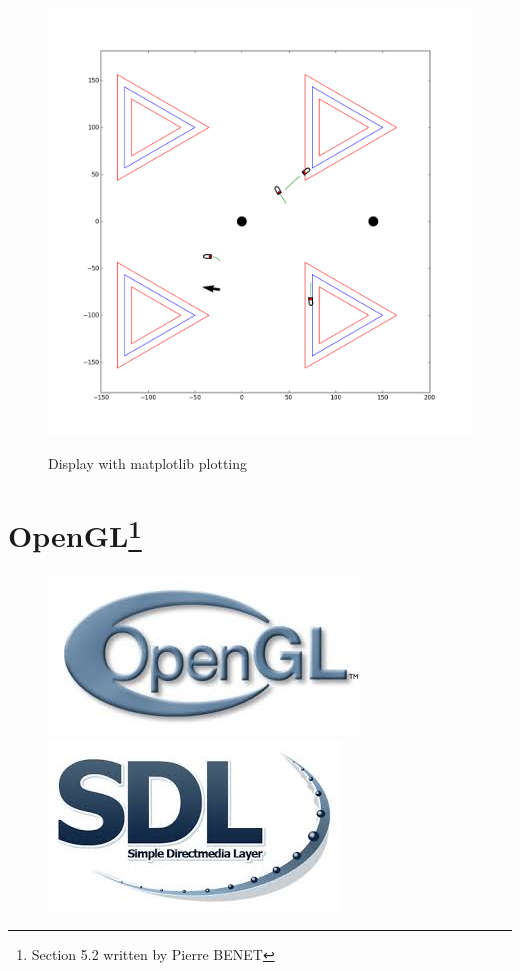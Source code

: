 \documentclass[a4paper]{report}
\begin{document}
\begin{figure}[H]
  \centering
  \includegraphics[scale = 0.4]{image/display3.png}
  \label{Flow2}
  \caption{Display with matplotlib plotting }
\end{figure}




\section[OpenGl]{OpenGL\footnote{Section 5.2 written by Pierre BENET}}

\begin{figure}[htbp]
  \begin{minipage}[b]{0.4\textwidth}
  \centering
    \includegraphics[scale =0.3]{image/opengl.jpeg}
  \end{minipage}
  \hfill
  \begin{minipage}[b]{0.4\textwidth}
  \centering
    \includegraphics[scale = 0.3]{image/SDL.jpeg}
  \end{minipage}
\end{figure}
\end{document}
